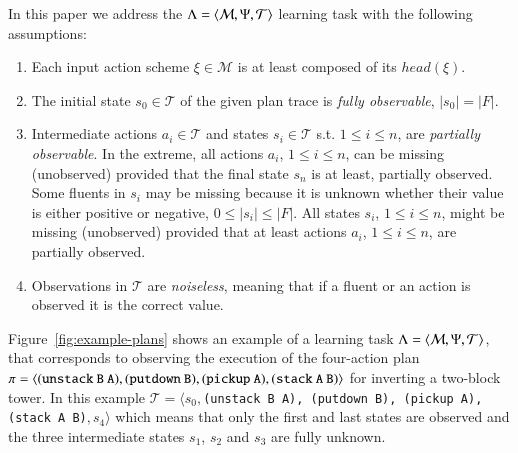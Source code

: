 In this paper we address the $\Lambda={\langle \mathcal{M},\Psi,\mathcal{T} \rangle}$ learning task with the following assumptions:
\begin{enumerate}
\item Each input action scheme $\xi\in\mathcal{M}$ is at least composed of its $head(\xi)$.
\item The initial state $s_0\in\mathcal{T}$ of the given plan trace is {\em fully observable}, $|s_0|=|F|$.
\item Intermediate actions $a_i\in\mathcal{T}$ and states $s_i\in\mathcal{T}$ s.t. {\small $1\leq i\leq n$}, are {\em partially observable}. In the extreme, all actions $a_i$, {\small $1\leq i\leq n$}, can be missing (unobserved) provided that the final state $s_n$ is at least, partially observed. Some fluents in $s_i$ may be missing because it is unknown whether their value is either positive or negative, $0\leq |s_i|\leq |F|$. All states $s_i$, {\small $1\leq i\leq n$}, might be missing (unobserved) provided that at least actions $a_i$, {\small $1\leq i\leq n$}, are partially observed.
 \item Observations in $\mathcal{T}$ are {\em noiseless}, meaning that if a fluent or an action is observed it is the correct value. 
\end{enumerate}
Figure~\ref{fig:example-plans} shows an example of a learning task $\Lambda={\langle \mathcal{M},\Psi,\mathcal{T} \rangle}$, that corresponds to observing the execution of the four-action plan $\pi=\tup{\small\tt (unstack\ B\ A), (putdown\ B), (pickup\ A), (stack\ A\ B)}$ for inverting a two-block tower. In this example $\mathcal{T}=\langle s_0,${\small\tt (unstack\ B\ A), (putdown\ B), (pickup\ A), (stack\ A\ B)}$,s_4\rangle$ which means that only the first and last states are observed and the three intermediate states $s_1$, $s_2$ and $s_3$ are fully unknown. 


